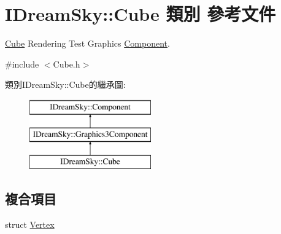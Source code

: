 \hypertarget{class_i_dream_sky_1_1_cube}{}\section{I\+Dream\+Sky\+:\+:Cube 類別 參考文件}
\label{class_i_dream_sky_1_1_cube}


\hyperlink{class_i_dream_sky_1_1_cube}{Cube} Rendering Test Graphics \hyperlink{class_i_dream_sky_1_1_component}{Component}.  




{\ttfamily \#include $<$Cube.\+h$>$}

類別\+I\+Dream\+Sky\+:\+:Cube的繼承圖\+:\begin{figure}[H]
\begin{center}
\leavevmode
\includegraphics[height=3.000000cm]{class_i_dream_sky_1_1_cube}
\end{center}
\end{figure}
\subsection*{複合項目}
\begin{DoxyCompactItemize}
\item 
struct \hyperlink{struct_i_dream_sky_1_1_cube_1_1_vertex}{Vertex}
\end{DoxyCompactItemize}
